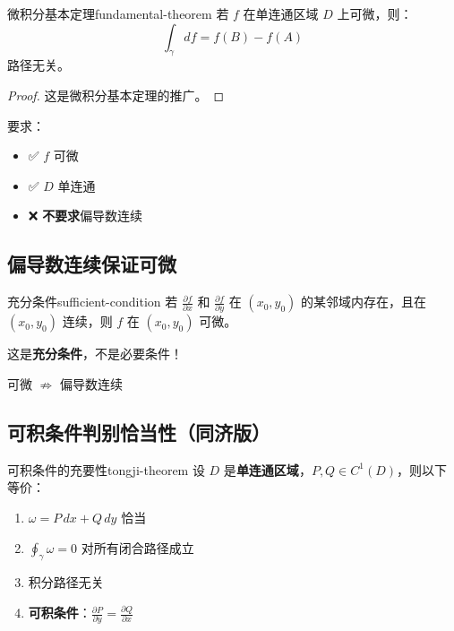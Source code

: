 \documentclass[12pt,a4paper]{article}
\begin{document}
\begin{theorem}{微积分基本定理}{fundamental-theorem}
若 $f$ 在单连通区域 $D$ 上可微，则：
\begin{equation}
\int_\gamma df = f(B) - f(A)
\end{equation}
路径无关。
\end{theorem}

\begin{proof}
这是微积分基本定理的推广。
\end{proof}

\begin{keypoint}
要求：
\begin{itemize}
\item ✅ $f$ 可微
\item ✅ $D$ 单连通
\item ❌ \textbf{不要求}偏导数连续
\end{itemize}
\end{keypoint}

\subsection{偏导数连续保证可微}

\begin{theorem}{充分条件}{sufficient-condition}
若 $\frac{\partial f}{\partial x}$ 和 $\frac{\partial f}{\partial y}$ 在 $(x_0, y_0)$ 的某邻域内存在，且在 $(x_0, y_0)$ 连续，则 $f$ 在 $(x_0, y_0)$ 可微。
\end{theorem}

\begin{warning}
这是\textbf{充分条件}，不是必要条件！

可微 $\not\Rightarrow$ 偏导数连续
\end{warning}

\subsection{可积条件判别恰当性（同济版）}

\begin{theorem}{可积条件的充要性}{tongji-theorem}
设 $D$ 是\textbf{单连通区域}，$P, Q \in C^1(D)$，则以下等价：
\begin{enumerate}
\item $\omega = P\,dx + Q\,dy$ 恰当
\item $\oint_\gamma \omega = 0$ 对所有闭合路径成立
\item 积分路径无关
\item \textbf{可积条件}：$\frac{\partial P}{\partial y} = \frac{\partial Q}{\partial x}$
\end{enumerate}
\end{theorem}
\end{document}
